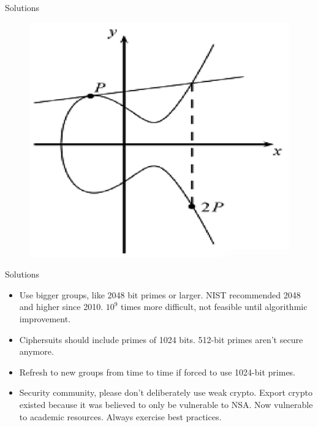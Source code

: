 \documentclass[presentation, aspectratio=54]{beamer}
\begin{document}

\begin{frame}{Solutions}

\begin{figure}
\centering
\includegraphics[width=0.6\columnwidth]{graphics/ElipticDH.png}
\end{figure}
    
\end{frame}


\begin{frame}{Solutions}

\begin{itemize}
\item Use bigger groups, like 2048 bit primes or larger. NIST recommended 2048
      and higher since 2010. $10^9$ times more difficult, not feasible until
      algorithmic improvement.
\item Ciphersuits should include primes of 1024 bits. 512-bit primes aren't
      secure anymore.
\item Refresh to new groups from time to time if forced to use 1024-bit primes.
\item Security community, please don't deliberately use weak crypto. Export
      crypto existed because it was believed to only be vulnerable to NSA. Now
      vulnerable to academic resources. Always exercise best practices.
\end{itemize}

\end{frame}

\end{document}
